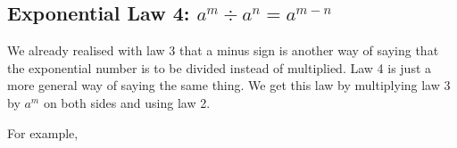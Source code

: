             \subsection{ Exponential Law 4: ${a}^{m}÷{a}^{n}={a}^{m-n}$}
            \nopagebreak
        \label{m38359*id65186}We already realised with law 3 that a minus sign is another way of saying that the exponential number is to be divided instead of multiplied. Law 4 is just a more general way of saying the same thing. We get this law by multiplying law 3 by \begin{math}{a}^{m}\end{math} on both sides and using law 2.\par 
        \label{m38359*uid24}\nopagebreak\noindent{}
        \label{m38359*id65293}For example,\par 
